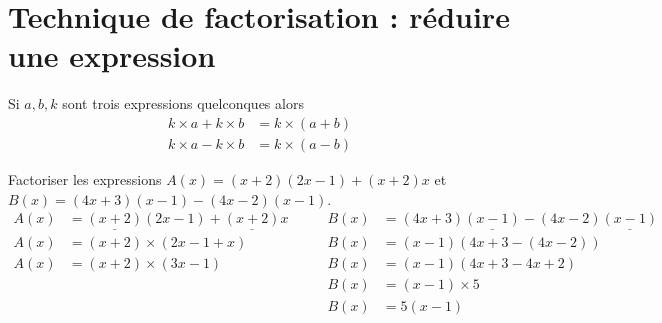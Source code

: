 \section{Technique de factorisation : réduire une expression}
\begin{propriete}
    Si $a,b,k$  sont trois expressions quelconques alors 
    \begin{align*}
        k\times a+k\times b&=k\times(a+b)\\
        k\times a-k\times b&=k\times(a-b)
    \end{align*}
\end{propriete}

\begin{exemples*1}
    Factoriser les expressions $A(x)=(x+2)(2x-1)+(x+2)x$ et $B(x)=(4x+3)(x-1)-(4x-2)(x-1)$. 
    \begin{align*}
        A(x)&=\underline{(x+2)}(2x-1)+\underline{(x+2)}x\qquad&B(x)&=(4x+3)\underline{(x-1)}-(4x-2)\underline{(x-1)}\\
        A(x)&=(x+2)\times(2x-1+x)                             &B(x)&=(x-1)(4x+3-(4x-2))\\
        A(x)&=(x+2)\times(3x-1)                               &B(x)&=(x-1)(4x+3-4x+2)\\
         &                                                    &B(x)&=(x-1)\times5\\
         &                                                    &B(x)&=5(x-1)         
    \end{align*}
    \vspace*{-10mm}
\end{exemples*1}
